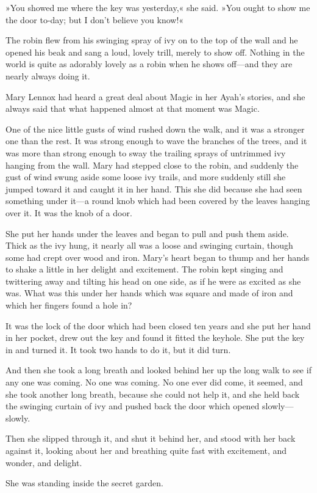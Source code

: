 »You showed me where the key was yesterday,« she said. »You ought to show me the door to-day; but I don't believe you know!«

The robin flew from his swinging spray of ivy on to the top of the wall and he opened his beak and sang a loud, lovely trill, merely to show off. Nothing in the world is quite as adorably lovely as a robin when he shows off—and they are nearly always doing it.

Mary Lennox had heard a great deal about Magic in her Ayah's stories, and she always said that what happened almost at that moment was Magic.

One of the nice little gusts of wind rushed down the walk, and it was a stronger one than the rest. It was strong enough to wave the branches of the trees, and it was more than strong enough to sway the trailing sprays of untrimmed ivy hanging from the wall. Mary had stepped close to the robin, and suddenly the gust of wind swung aside some loose ivy trails, and more suddenly still she jumped toward it and caught it in her hand. This she did because she had seen something under it—a round knob which had been covered by the leaves hanging over it. It was the knob of a door.

She put her hands under the leaves and began to pull and push them aside. Thick as the ivy hung, it nearly all was a loose and swinging curtain, though some had crept over wood and iron. Mary's heart began to thump and her hands to shake a little in her delight and excitement. The robin kept singing and twittering away and tilting his head on one side, as if he were as excited as she was. What was this under her hands which was square and made of iron and which her fingers found a hole in?

It was the lock of the door which had been closed ten years and she put her hand in her pocket, drew out the key and found it fitted the keyhole. She put the key in and turned it. It took two hands to do it, but it did turn.

And then she took a long breath and looked behind her up the long walk to see if any one was coming. No one was coming. No one ever did come, it seemed, and she took another long breath, because she could not help it, and she held back the swinging curtain of ivy and pushed back the door which opened slowly—slowly.

Then she slipped through it, and shut it behind her, and stood with her back against it, looking about her and breathing quite fast with excitement, and wonder, and delight.

She was standing inside the secret garden.